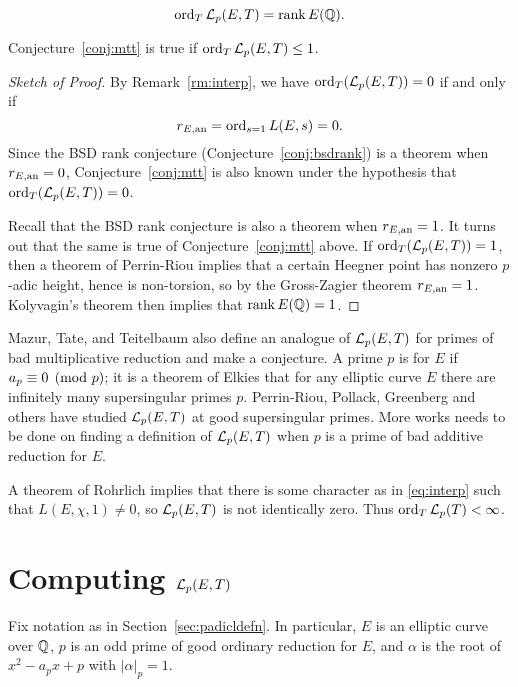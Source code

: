 \begin{conjecture}\label{conj:mtt}
$$
\operatorname{ord}_{T} \mathcal{L}_p(E,T) = \operatorname{rank} E(\mathbb{Q}).
$$
\end{conjecture}

\begin{proposition}
Conjecture~\ref{conj:mtt} is true if $\operatorname{ord}_{T}\mathcal{L}_p(E,T) \leq 1$.
\end{proposition}
\begin{proof}[Sketch of Proof]
By Remark~\ref{rm:interp}, we have
$\operatorname{ord}_T(\mathcal{L}_p(E,T)) = 0$ if and only
if $$r_{E,{\rm an}} = \operatorname{ord}_{s=1} L(E,s) = 0.$$  Since 
the BSD rank conjecture (Conjecture~\ref{conj:bsdrank}) is a theorem when
$r_{E,{\rm an}} = 0$, Conjecture~\ref{conj:mtt}
is also known under the hypothesis
that $\operatorname{ord}_T(\mathcal{L}_p(E,T)) = 0$.

Recall that the BSD rank conjecture is also a theorem
when $r_{E,{\rm an}}=1$.  It turns out that the same is true
of Conjecture~\ref{conj:mtt} above.
If $\operatorname{ord}_T(\mathcal{L}_p(E,T)) = 1$, then
a theorem of Perrin-Riou implies that
a certain Heegner point has nonzero $p$-adic
height, hence is non-torsion, so by the
Gross-Zagier theorem $r_{E,{\rm an}}=1$.
Kolyvagin's theorem then implies that
$\operatorname{rank} E(\mathbb{Q})=1$. 
\end{proof}

\begin{remark}
Mazur, Tate, and Teitelbaum also define an analogue of $\mathcal{L}_p(E,T)$ for
primes of bad multiplicative reduction and make
a conjecture.  A prime $p$ is 
for $E$ if $a_p \equiv 0 \pmod{p}$; it is a theorem
of Elkies \cite{elkies:supersingular} that for any elliptic curve $E$ there
are infinitely many supersingular primes $p$.
Perrin-Riou, Pollack, Greenberg
and others have studied $\mathcal{L}_p(E,T)$ at good 
supersingular primes.  More works needs to be done on 
finding a  definition of $\mathcal{L}_p(E,T)$ when $p$ is a prime
of bad additive reduction for $E$.
\end{remark}


\begin{remark}
A theorem of Rohrlich implies that there is some character
as in \eqref{eq:interp} such that $L(E,\chi,1)\neq 0$,
so $\mathcal{L}_p(E,T)$ is not identically zero.  Thus $\operatorname{ord}_T \mathcal{L}_p(T)<\infty$.
\end{remark}

\section{Computing $\mathcal{L}_p(E,T)$}\label{sec:computepadicl}
Fix notation as in Section~\ref{sec:padicldefn}.  In particular, $E$
is an elliptic curve over $\mathbb{Q}$, $p$ is an odd prime of good ordinary
reduction for $E$, and $\alpha$ is the root of $x^2-a_px+p$ with
$|\alpha|_p = 1$.

